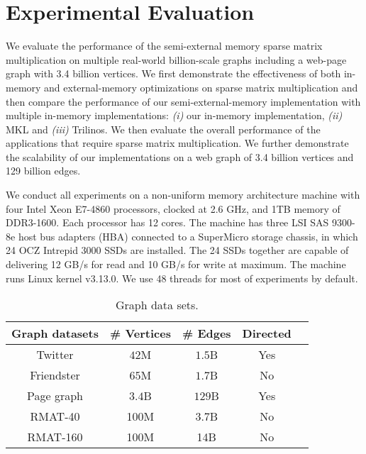 \section{Experimental Evaluation}

We evaluate the performance of the semi-external memory sparse matrix
multiplication on multiple real-world billion-scale graphs including a web-page
graph with 3.4 billion vertices. We first demonstrate the effectiveness of
both in-memory and external-memory optimizations on sparse matrix multiplication
and then compare the performance of our semi-external-memory implementation with
multiple in-memory implementations: \textit{(i)} our in-memory implementation,
\textit{(ii)} MKL and \textit{(iii)} Trilinos. We then evaluate the overall
performance of the applications that require sparse matrix multiplication.
We further demonstrate the scalability of our implementations on a web graph
of 3.4 billion vertices and 129 billion edges.

We conduct all experiments on a non-uniform memory architecture machine with
four Intel Xeon E7-4860 processors, clocked at 2.6 GHz, and 1TB memory of
DDR3-1600. Each processor has 12 cores. The machine has three LSI SAS 9300-8e
host bus adapters (HBA) connected to a SuperMicro storage chassis, in which
24 OCZ Intrepid 3000 SSDs are installed. The 24 SSDs together are capable of
delivering 12 GB/s for read and 10 GB/s for write at maximum. The machine runs
Linux kernel v3.13.0. We use 48 threads for most of experiments by default.

\begin{table}
\begin{center}
\footnotesize
\begin{tabular}{|c|c|c|c|c|}
\hline
Graph datasets & \# Vertices & \# Edges & Directed \\
\hline
Twitter \cite{twitter} & $42$M & $1.5$B & Yes \\
\hline
Friendster \cite{friendster} & $65$M & $1.7$B & No \\
\hline
Page graph \cite{web_graph} & $3.4$B & $129$B & Yes \\
\hline
RMAT-40 \cite{rmat} & 100M & 3.7B & No \\
\hline
RMAT-160 \cite{rmat} & 100M & 14B & No \\
\hline
\end{tabular}
\normalsize
\end{center}
\caption{Graph data sets.}
\label{graphs}
\end{table}


